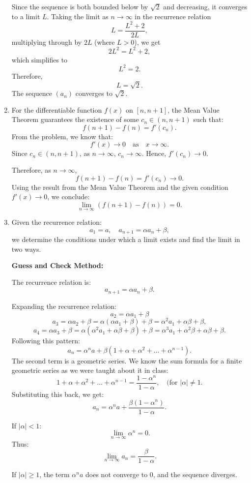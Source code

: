 \documentclass[12pt]{article}
\begin{document}
\begin{enumerate}
Since the sequence is both bounded below by \(\sqrt{2}\) and decreasing, it converges to a limit \(L\). Taking the limit as \(n \to \infty\) in the recurrence relation
\[
L = \frac{L^2 + 2}{2L},
\]
multiplying through by \(2L\) (where \(L > 0\)), we get
\[
2L^2 = L^2 + 2,
\]
which simplifies to
\[
L^2 = 2.
\]
Therefore,
\[
L = \sqrt{2}.
\]
The sequence \((a_n)\) converges to \(\sqrt{2}\).

\item 
For the differentiable function \(f(x)\) on \([n, n+1]\), the Mean Value Theorem guarantees the existence of some \(c_n \in (n, n+1)\) such that:
\[
f(n+1) - f(n) = f'(c_n).
\]
From the problem, we know that:
\[
f'(x) \to 0 \quad \text{as} \quad x \to \infty.
\]
Since \(c_n \in (n, n+1)\), as \(n \to \infty\), \(c_n \to \infty\). Hence, \(f'(c_n) \to 0\).

Therefore, as \(n \to \infty\),
\[
f(n+1) - f(n) = f'(c_n) \to 0.
\]
Using the result from the Mean Value Theorem and the given condition \(f'(x) \to 0\), we conclude:
\[
\lim_{n \to \infty} (f(n+1) - f(n)) = 0.
\]

\item Given the recurrence relation:
\[
a_1 = a, \quad a_{n+1} = \alpha a_n + \beta,
\]
we determine the conditions under which a limit exists and find the limit in two ways.

\textbf{Guess and Check Method:}

The recurrence relation is:
\[
a_{n+1} = \alpha a_n + \beta.
\]

Expanding the recurrence relation:
\[
a_2 = \alpha a_1 + \beta
\]
\[
a_3 = \alpha a_2 + \beta = \alpha(\alpha a_1 + \beta) + \beta = \alpha^2 a_1 + \alpha \beta + \beta,
\]
\[
a_4 = \alpha a_3 + \beta = \alpha(\alpha^2 a_1 + \alpha \beta + \beta) + \beta = \alpha^3 a_1 + \alpha^2 \beta + \alpha \beta + \beta.
\]
Following this pattern:
\[
a_n = \alpha^n a + \beta(1 + \alpha + \alpha^2 + \dots + \alpha^{n-1}).
\]
The second term is a geometric series. We know the sum formula for a finite geometric series as we were taught about it in class:
\[
1 + \alpha + \alpha^2 + \dots + \alpha^{n-1} = \frac{1 - \alpha^n}{1 - \alpha}, \quad \text{(for \(|\alpha| \neq 1\)}.
\]
Substituting this back, we get:
\[
a_n = \alpha^n a + \frac{\beta(1 - \alpha^n)}{1 - \alpha}.
\]

If \(|\alpha| < 1\):
\[
\lim_{n \to \infty} \alpha^n = 0.
\]
Thus:
\[
\lim_{n \to \infty} a_n = \frac{\beta}{1 - \alpha}.
\]

If \(|\alpha| \geq 1\), the term \(\alpha^n a\) does not converge to 0, and the sequence diverges.


\end{enumerate}
\end{document}
